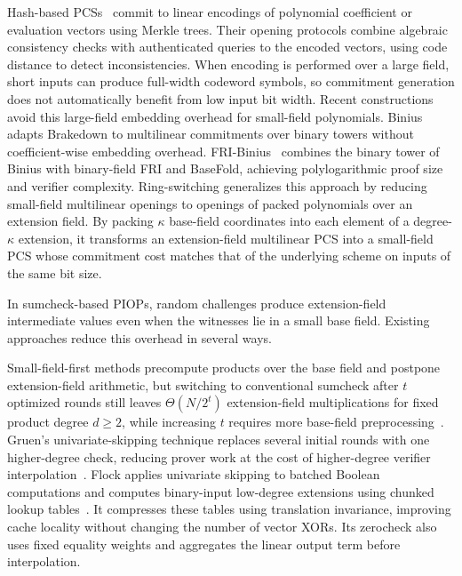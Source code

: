 Hash-based PCSs~\cite{icalp/Ben-SassonBHR18,crypto/ArnonCFY24,%
eurocrypt/ArnonCFY25,iacr/KohritaT23,ccs/AmesHIYM17,%
focs/Ben-SassonCIKS20,crypto/GolovnevLSTW23,crypto/XieZS22,%
crypto/BlockFK24,iacr/LiLXYY26,crypto/ZeilbergerCF24,%
usenix/GuoLHQTZ25,eurocrypt/BrehmCFRRZ25,%
asiacrypt/NariST25,iacr/BunzFRW25}
commit to linear encodings of polynomial coefficient or
evaluation vectors using Merkle trees.
Their opening protocols combine algebraic consistency checks
with authenticated queries to the encoded vectors, using
code distance to detect inconsistencies.
When encoding is performed over a large field, short inputs
can produce full-width codeword symbols, so commitment
generation does not automatically benefit from low input
bit width.
Recent constructions avoid this large-field embedding
overhead for small-field polynomials.
Binius~\cite{eurocrypt/DiamondP25} adapts Brakedown to
multilinear commitments over binary towers without
coefficient-wise embedding overhead.
FRI-Binius~\cite{iacr/BenjaminDP24} combines the binary tower of Binius with binary-field FRI and BaseFold,
achieving polylogarithmic proof size and verifier complexity.
Ring-switching generalizes this approach by reducing small-field
multilinear openings to openings of packed polynomials over
an extension field.
By packing \(\kappa\) base-field coordinates into each element
of a degree-\(\kappa\) extension, it transforms an extension-field
multilinear PCS into a small-field PCS whose commitment cost
matches that of the underlying scheme on inputs of the same
bit size.


\medskip
{}
In sumcheck-based PIOPs, random challenges produce
extension-field intermediate values even when the witnesses
lie in a small base field.
Existing approaches reduce this overhead in several ways.

Small-field-first methods precompute products over the base
field and postpone extension-field arithmetic, but switching
to conventional sumcheck after \(t\) optimized rounds still
leaves \(\Theta(N/2^t)\) extension-field multiplications for
fixed product degree \(d\geq 2\), while increasing \(t\)
requires more base-field
preprocessing~\cite{iacr/BagadDT24,iacr/BagadDDT25,iacr/DaoDBDT26}.
Gruen's univariate-skipping technique replaces several initial
rounds with one higher-degree check, reducing prover work
at the cost of higher-degree verifier
interpolation~\cite{iacr/Gruen24}.
Flock applies univariate skipping to batched Boolean computations
and computes binary-input low-degree extensions using chunked
lookup tables~\cite{iacr/BunzRW26}. It compresses these tables
using translation invariance, improving cache locality without
changing the number of vector XORs. Its zerocheck also uses
fixed equality weights and aggregates the linear output term
before interpolation.

